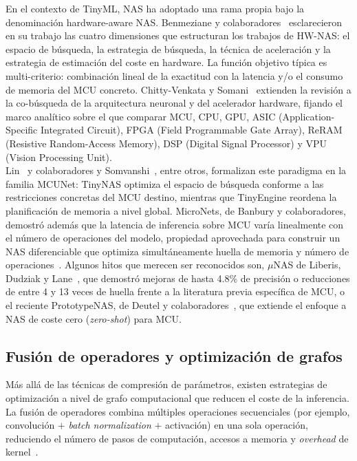 \documentclass[a4paper,12pt,twoside,final]{book}
\begin{document}
En el contexto de TinyML, NAS ha adoptado una rama propia bajo la denominación hardware-aware NAS. Benmeziane y
colaboradores~\cite{benmeziane2021hardware} esclarecieron en su trabajo las cuatro dimensiones que estructuran
los trabajos de HW-NAS: el espacio de búsqueda, la estrategia de búsqueda, la técnica de aceleración y la estrategia
de estimación del coste en hardware. La función objetivo típica es multi-criterio: combinación lineal de la exactitud
con la latencia y/o el consumo de memoria del MCU concreto. Chitty-Venkata y Somani~\cite{chitty2022acm} extienden la
revisión a la co-búsqueda de la arquitectura neuronal y del acelerador hardware, fijando el marco analítico sobre el
que comparar MCU, CPU, GPU, ASIC (Application-Specific Integrated Circuit), FPGA (Field Programmable Gate Array),
ReRAM (Resistive Random-Access Memory), DSP (Digital Signal Processor) y VPU (Vision Processing Unit).\\

Lin~\cite{lin2023ieeemcas,lin2020nips} y colaboradores y Somvanshi~\cite{somvanshi2025acm}, entre otros, formalizan
este paradigma en la familia MCUNet: TinyNAS optimiza el espacio de búsqueda conforme a las restricciones concretas
del MCU destino, mientras que TinyEngine reordena la planificación de memoria a nivel global. MicroNets, de Banbury y
colaboradores, demostró además que la latencia de inferencia sobre MCU varía linealmente con el número de operaciones
del modelo, propiedad aprovechada para construir un NAS diferenciable que optimiza simultáneamente huella de memoria
y número de operaciones~\cite{banbury2020mlperf}. Algunos hitos que merecen ser reconocidos son, $\mu$NAS de Liberis,
Dudziak y Lane~\cite{liberis2021acm}, que demostró mejoras de hasta 4.8\% de precisión o reducciones de entre 4 y 13
veces de huella frente a la literatura previa específica de MCU, o el reciente PrototypeNAS, de Deutel y
colaboradores~\cite{deutel2026prototypenas}, que extiende el enfoque a NAS de coste cero (\textit{zero-shot})
para MCU.

\subsection{Fusión de operadores y optimización de grafos}
Más allá de las técnicas de compresión de parámetros, existen estrategias de optimización a nivel de grafo
computacional que reducen el coste de la inferencia. La fusión de operadores combina múltiples operaciones
secuenciales (por ejemplo, convolución $+$ \textit{batch normalization} $+$ activación) en una sola operación,
reduciendo el número de pasos de computación, accesos a memoria y \textit{overhead} de
kernel~\cite{somvanshi2025acm,zheng2025diffusion}.\\
\end{document}

